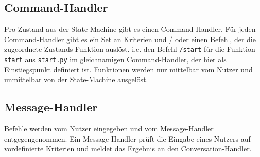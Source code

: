         \subsection{Command-Handler} \label{Implementierung: Command-Handler}
            Pro Zustand aus der State Machine gibt es einen Command-Handler. Für jeden Command-Handler gibt es ein Set an Kriterien und / oder einen Befehl, der die zugeordnete Zustands-Funktion auslöst. i.e. den Befehl \verb|/start| für die Funktion \verb|start| aus \verb|start.py| im gleichnamigen Command-Handler, der hier als Einstiegspunkt definiert ist. Funktionen werden nur mittelbar vom Nutzer und unmittelbar von der State-Machine ausgelöst.

        \subsection{Message-Handler} \label{Implementierung: Message-Handler}
            Befehle werden vom Nutzer eingegeben und vom Message-Handler entgegengenommen. Ein Message-Handler prüft die Eingabe eines Nutzers auf vordefinierte Kriterien und meldet das Ergebnis an den Conversation-Handler.

